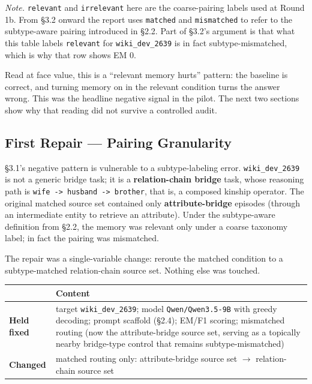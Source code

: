 \documentclass[11pt]{article}
\begin{document}
\textit{Note.} \texttt{relevant} and \texttt{irrelevant} here are the coarse-pairing labels used at Round 1b. From \S3.2 onward the report uses \texttt{matched} and \texttt{mismatched} to refer to the subtype-aware pairing introduced in \S2.2. Part of \S3.2's argument is that what this table labels \texttt{relevant} for \texttt{wiki\_dev\_2639} is in fact subtype-mismatched, which is why that row shows EM 0.

Read at face value, this is a ``relevant memory hurts'' pattern: the baseline is correct, and turning memory on in the relevant condition turns the answer wrong. This was the headline negative signal in the pilot. The next two sections show why that reading did not survive a controlled audit.

\subsection{First Repair --- Pairing Granularity}

\S3.1's negative pattern is vulnerable to a subtype-labeling error. \texttt{wiki\_dev\_2639} is not a generic bridge task; it is a \textbf{relation-chain bridge} task, whose reasoning path is \texttt{wife -> husband -> brother}, that is, a composed kinship operator. The original matched source set contained only \textbf{attribute-bridge} episodes (through an intermediate entity to retrieve an attribute). Under the subtype-aware definition from \S2.2, the memory was relevant only under a coarse taxonomy label; in fact the pairing was mismatched.

The repair was a single-variable change: reroute the matched condition to a subtype-matched relation-chain source set. Nothing else was touched.

\begin{center}
\begin{tabularx}{\textwidth}{>{\raggedright\arraybackslash}p{}Y}
\toprule
 & Content \\
\midrule
\textbf{Held fixed} & target \texttt{wiki\_dev\_2639}; model \texttt{Qwen/Qwen3.5-9B} with greedy decoding; prompt scaffold (\S2.4); EM/F1 scoring; mismatched routing (now the attribute-bridge source set, serving as a topically nearby bridge-type control that remains subtype-mismatched) \\
\textbf{Changed} & matched routing only: attribute-bridge source set $\rightarrow$ relation-chain source set \\
\bottomrule
\end{tabularx}
\end{center}
\end{document}
